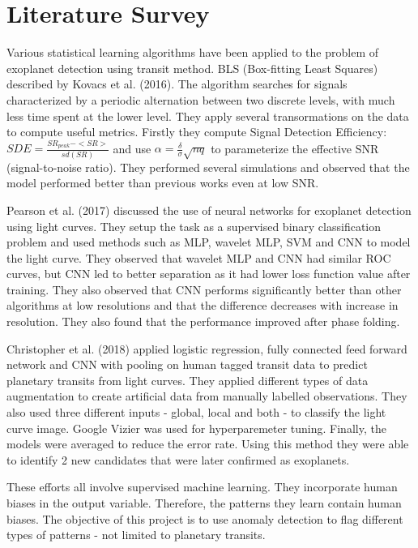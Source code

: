 \documentclass[%
aip,
amsmath,amssymb,
reprint,%
]{revtex4-1}
\begin{document}
\section{Literature Survey}

Various statistical learning algorithms have been applied to the problem of exoplanet detection using transit method. BLS (Box-fitting Least Squares) described by Kovacs et al. (2016). The algorithm searches for signals characterized by a periodic alternation between two discrete levels, with much less time spent at the lower level. They apply several transormations on the data to compute useful metrics. Firstly they compute Signal Detection Efficiency: $SDE = \frac{SR_{peak}-<SR>}{sd(SR)}$ and use $\alpha = \frac{\delta}{\sigma}\sqrt{nq}$ to parameterize the effective SNR (signal-to-noise ratio). They performed several simulations and observed that the model performed better than previous works even at low SNR.

Pearson et al. (2017) discussed the use of neural networks for exoplanet detection using light curves. They setup the task as a supervised binary classification problem and used methods such as MLP, wavelet MLP, SVM and CNN to model the light curve. They observed that wavelet MLP and CNN had similar ROC curves, but CNN led to better separation as it had lower loss function value after training. They also observed that CNN performs significantly better than other algorithms at low resolutions and that the difference decreases with increase in resolution. They also found that the performance improved after phase folding.

Christopher et al. (2018) applied logistic regression, fully connected feed forward network and CNN with pooling on human tagged transit data to predict planetary transits from light curves. They applied different types of data augmentation to create artificial data from manually labelled observations. They also used three different inputs - global, local and both - to classify the light curve image. Google Vizier was used for hyperparemeter tuning. Finally, the models were averaged to reduce the error rate. Using this method they were able to identify 2 new candidates that were later confirmed as exoplanets.

These efforts all involve supervised machine learning. They incorporate human biases in the output variable. Therefore, the patterns they learn contain human biases. The objective of this project is to use anomaly detection to flag different types of patterns - not limited to planetary transits.
\end{document}
